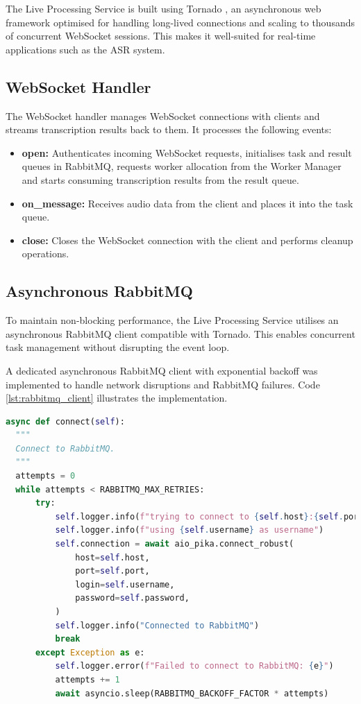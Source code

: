 The Live Processing Service is built using Tornado \cite{tornado}, an asynchronous web framework optimised for handling long-lived connections and scaling to thousands of concurrent WebSocket sessions. This makes it well-suited for real-time applications such as the ASR system.

\subsection{WebSocket Handler}
The WebSocket handler manages WebSocket connections with clients and streams transcription results back to them. It processes the following events:

\begin{itemize}
    \item \textbf{open:} Authenticates incoming WebSocket requests, initialises task and result queues in RabbitMQ, requests worker allocation from the Worker Manager and starts consuming transcription results from the result queue.
    \item \textbf{on\_message:} Receives audio data from the client and places it into the task queue.
    \item \textbf{close:} Closes the WebSocket connection with the client and performs cleanup operations.
\end{itemize}

\subsection{Asynchronous RabbitMQ}
To maintain non-blocking performance, the Live Processing Service utilises an asynchronous RabbitMQ client compatible with Tornado. This enables concurrent task management without disrupting the event loop.

A dedicated asynchronous RabbitMQ client with exponential backoff was implemented to handle network disruptions and RabbitMQ failures. Code \ref{lst:rabbitmq_client} illustrates the implementation.

\begin{lstlisting}[language=python, caption={Asynchronous RabbitMQ Client}, label={lst:rabbitmq_client}]
async def connect(self):
  """
  Connect to RabbitMQ.
  """
  attempts = 0
  while attempts < RABBITMQ_MAX_RETRIES:
      try:
          self.logger.info(f"trying to connect to {self.host}:{self.port}")
          self.logger.info(f"using {self.username} as username")
          self.connection = await aio_pika.connect_robust(
              host=self.host,
              port=self.port,
              login=self.username,
              password=self.password,
          )
          self.logger.info("Connected to RabbitMQ")
          break
      except Exception as e:
          self.logger.error(f"Failed to connect to RabbitMQ: {e}")
          attempts += 1
          await asyncio.sleep(RABBITMQ_BACKOFF_FACTOR * attempts)
\end{lstlisting}

